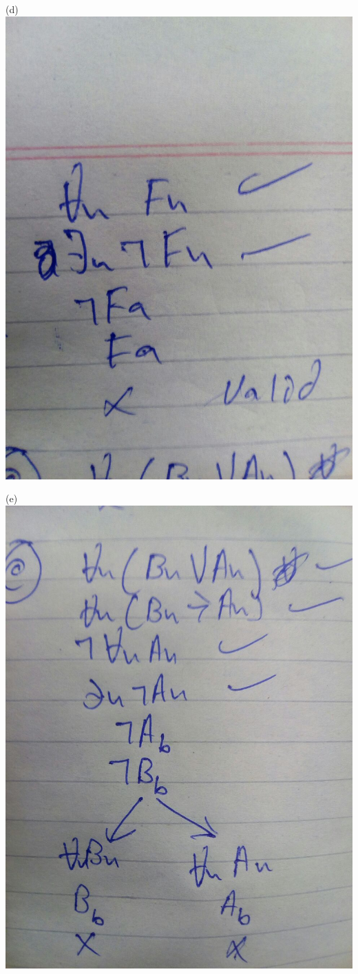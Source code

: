 \documentclass{article}
\begin{document}
(d) \includegraphics[width=\linewidth]{IMG_1021.JPG}

(e) \includegraphics[width=\linewidth]{IMG_1020.JPG}
\end{document}
